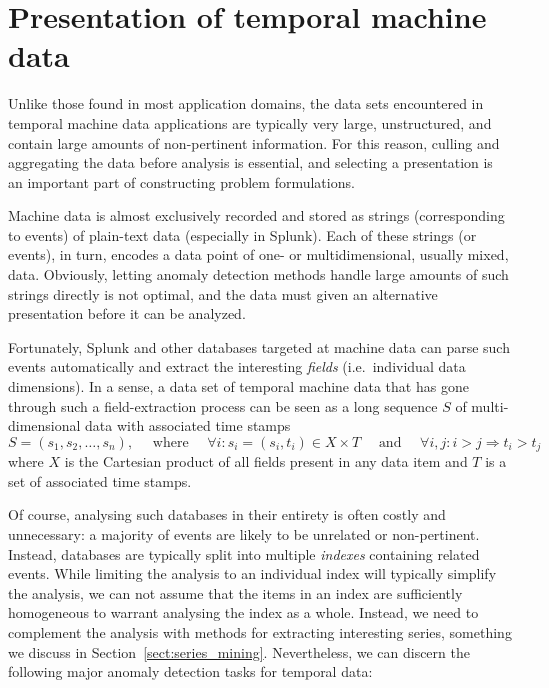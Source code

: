 \section{Presentation of temporal machine data}
\label{sect:splunk_techniques}

Unlike those found in most application domains, the data sets encountered in temporal machine data applications are typically very large, unstructured, and contain large amounts of non-pertinent information. For this reason, culling and aggregating the data before analysis is essential, and selecting a presentation is an important part of constructing problem formulations.

Machine data is almost exclusively recorded and stored as strings (corresponding to events) of plain-text data (especially in Splunk). Each of these strings (or events), in turn, encodes a data point of one- or multidimensional, usually mixed, data. Obviously, letting anomaly detection methods handle large amounts of such strings directly is not optimal, and the data must given an alternative presentation before it can be analyzed.

Fortunately, Splunk and other databases targeted at machine data can parse such events automatically and extract the interesting \emph{fields} (i.e.\ individual data dimensions). In a sense, a data set of temporal machine data that has gone through such a field-extraction process can be seen as a long sequence $S$ of multi-dimensional data with associated time stamps
\[
  S = (s_1, s_2, \dots, s_n), \quad \text{ where } \quad \forall i: s_i = (s_i, t_i) \in X \times T \quad \text{ and } \quad \forall i,j: i > j \Rightarrow t_i > t_j
\]
where $X$ is the Cartesian product of all fields present in any data item and $T$ is a set of associated time stamps.

Of course, analysing such databases in their entirety is often costly and unnecessary: a majority of events are likely to be unrelated or non-pertinent. Instead, databases are typically split into multiple \emph{indexes} containing related events. While limiting the analysis to an individual index will typically simplify the analysis, we can not assume that the items in an index are sufficiently homogeneous to warrant analysing the index as a whole. Instead, we need to complement the analysis with methods for extracting interesting series, something we discuss in Section~\ref{sect:series_mining}. Nevertheless, we can discern the following major anomaly detection tasks for temporal data:

